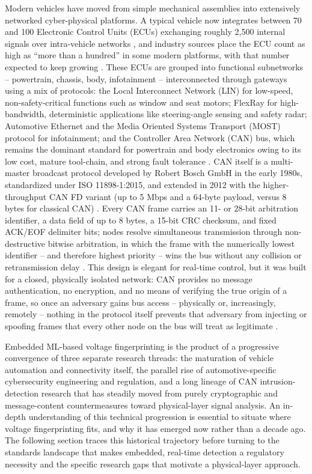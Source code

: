 \documentclass[journal]{IEEEtran}
\begin{document}
	Modern vehicles have moved from simple mechanical assemblies into
	extensively networked cyber-physical platforms. A typical vehicle now
	integrates between 70 and 100 Electronic Control Units (ECUs) exchanging
	roughly 2,500 internal signals over intra-vehicle networks
	\cite{ref6,ref8,ref9}, and industry sources place the ECU count as high as
	``more than a hundred'' in some modern platforms, with that number expected
	to keep growing \cite{ref10}. These ECUs are grouped into functional
	subnetworks -- powertrain, chassis, body, infotainment -- interconnected
	through gateways using a mix of protocols: the Local Interconnect Network
	(LIN) for low-speed, non-safety-critical functions such as window and seat
	motors; FlexRay for high-bandwidth, deterministic applications like
	steering-angle sensing and safety radar; Automotive Ethernet and the Media
	Oriented Systems Transport (MOST) protocol for infotainment; and the
	Controller Area Network (CAN) bus, which remains the dominant standard for
	powertrain and body electronics owing to its low cost, mature tool-chain,
	and strong fault tolerance \cite{ref4,ref6,ref9,ref10}. CAN itself is a
	multi-master broadcast protocol developed by Robert Bosch GmbH in the
	early 1980s, standardized under ISO 11898-1:2015, and extended in 2012
	with the higher-throughput CAN FD variant (up to 5 Mbps and a 64-byte
	payload, versus 8 bytes for classical CAN) \cite{ref10}. Every CAN frame
	carries an 11- or 28-bit arbitration identifier, a data field of up to 8
	bytes, a 15-bit CRC checksum, and fixed ACK/EOF delimiter bits; nodes
	resolve simultaneous transmission through non-destructive bitwise
	arbitration, in which the frame with the numerically lowest identifier --
	and therefore highest priority -- wins the bus without any collision or
	retransmission delay \cite{ref10}. This design is elegant for real-time
	control, but it was built for a closed, physically isolated network: CAN
	provides no message authentication, no encryption, and no means of
	verifying the true origin of a frame, so once an adversary gains bus
	access -- physically or, increasingly, remotely -- nothing in the
	protocol itself prevents that adversary from injecting or spoofing frames
	that every other node on the bus will treat as legitimate
	\cite{ref4,ref6,ref10}.
	
	Embedded ML-based voltage fingerprinting is the product of a progressive
	convergence of three separate research threads: the maturation of vehicle
	automation and connectivity itself, the parallel rise of
	automotive-specific cybersecurity engineering and regulation, and a long
	lineage of CAN intrusion-detection research that has steadily moved from
	purely cryptographic and message-content countermeasures toward
	physical-layer signal analysis. An in-depth understanding of this
	technical progression is essential to situate where voltage fingerprinting
	fits, and why it has emerged now rather than a decade ago. The following
	section traces this historical trajectory before turning to the standards
	landscape that makes embedded, real-time detection a regulatory necessity
	and the specific research gaps that motivate a physical-layer approach.
	
\end{document}
